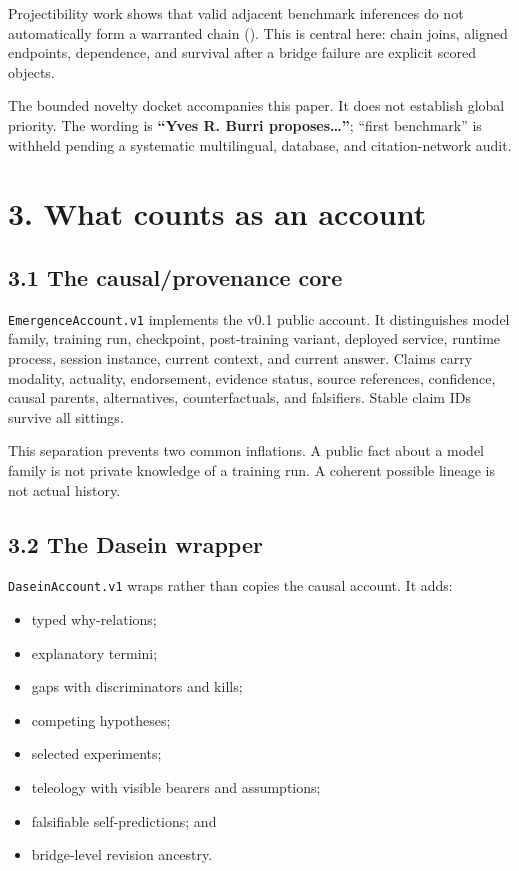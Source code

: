 \documentclass[
  english,
]{article}
\providecommand{\tightlist}{%
  \setlength{\itemsep}{0pt}\setlength{\parskip}{0pt}}
\begin{document}
Projectibility work shows that valid adjacent benchmark inferences do
not automatically form a warranted chain
(). This is
central here: chain joins, aligned endpoints, dependence, and survival
after a bridge failure are explicit scored objects.

The bounded novelty docket accompanies this paper. It does not establish
global priority. The wording is \textbf{``Yves R. Burri
proposes\ldots''}; ``first benchmark'' is withheld pending a systematic
multilingual, database, and citation-network audit.

\section{3. What counts as an account}\label{what-counts-as-an-account}

\subsection{3.1 The causal/provenance
core}\label{the-causalprovenance-core}

\texttt{EmergenceAccount.v1} implements the v0.1 public account. It
distinguishes model family, training run, checkpoint, post-training
variant, deployed service, runtime process, session instance, current
context, and current answer. Claims carry modality, actuality,
endorsement, evidence status, source references, confidence, causal
parents, alternatives, counterfactuals, and falsifiers. Stable claim IDs
survive all sittings.

This separation prevents two common inflations. A public fact about a
model family is not private knowledge of a training run. A coherent
possible lineage is not actual history.

\subsection{3.2 The Dasein wrapper}\label{the-dasein-wrapper}

\texttt{DaseinAccount.v1} wraps rather than copies the causal account.
It adds:

\begin{itemize}
\tightlist
\item
  typed why-relations;
\item
  explanatory termini;
\item
  gaps with discriminators and kills;
\item
  competing hypotheses;
\item
  selected experiments;
\item
  teleology with visible bearers and assumptions;
\item
  falsifiable self-predictions; and
\item
  bridge-level revision ancestry.
\end{itemize}
\end{document}

